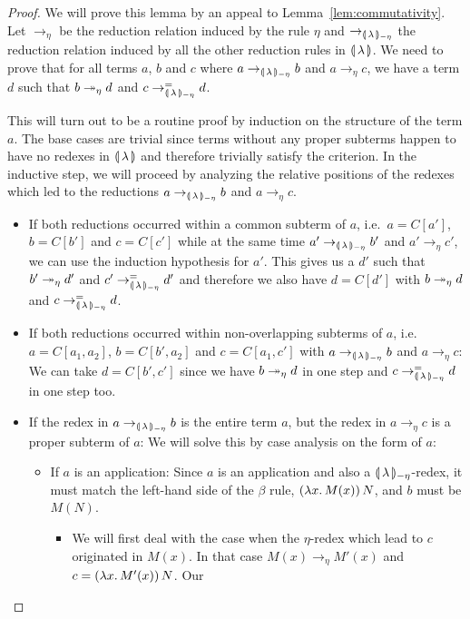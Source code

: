 \begin{proof}
  We will prove this lemma by an appeal to
  Lemma~\ref{lem:commutativity}. Let $\to_\eta$ be the reduction relation
  induced by the rule $\eta$ and $\to_{{\llparenthesis \, \lambda \, \rrparenthesis_{-\eta}}}$ the reduction
  relation induced by all the other reduction rules in
  $\llparenthesis \, \lambda \, \rrparenthesis$. We need to prove that for all terms $a$, $b$ and $c$
  where $a \to_{{\llparenthesis \, \lambda \, \rrparenthesis_{-\eta}}} b$ and $a \to_\eta c$, we have a term $d$ such that
  $b \twoheadrightarrow_\eta d$ and $c \to_{{\llparenthesis \, \lambda \, \rrparenthesis_{-\eta}}}^= d$.

  This will turn out to be a routine proof by induction on the structure of
  the term $a$. The base cases are trivial since terms without any proper
  subterms happen to have no redexes in $\llparenthesis \, \lambda \, \rrparenthesis$ and therefore
  trivially satisfy the criterion. In the inductive step, we will proceed
  by analyzing the relative positions of the redexes which led to the
  reductions $a \to_{{\llparenthesis \, \lambda \, \rrparenthesis_{-\eta}}} b$ and $a \to_\eta c$.
  \begin{itemize}
  \item If both reductions occurred within a common subterm of $a$, i.e.\
    $a = C[a']$, $b = C[b']$ and $c = C[c']$ while at the same time
    $a' \to_{{\llparenthesis \, \lambda \, \rrparenthesis_{-\eta}}} b'$ and $a' \to_\eta c'$, we can use the induction
    hypothesis for $a'$. This gives us a $d'$ such that $b' \twoheadrightarrow_\eta d'$
    and $c' \to_{{\llparenthesis \, \lambda \, \rrparenthesis_{-\eta}}}^= d'$ and therefore we also have $d = C[d']$ with
    $b \twoheadrightarrow_\eta d$ and $c \to_{{\llparenthesis \, \lambda \, \rrparenthesis_{-\eta}}}^= d$.
  \item If both reductions occurred within non-overlapping subterms of $a$,
    i.e.\ $a = C[a_1, a_2]$, $b = C[b', a_2]$ and $c = C[a_1, c']$ with
    $a \to_{{\llparenthesis \, \lambda \, \rrparenthesis_{-\eta}}} b$ and $a \to_\eta c$: We can take $d = C[b', c']$ since
    we have $b \twoheadrightarrow_\eta d$ in one step and $c \to_{{\llparenthesis \, \lambda \, \rrparenthesis_{-\eta}}}^= d$ in one step
    too.
  \item If the redex in $a \to_{{\llparenthesis \, \lambda \, \rrparenthesis_{-\eta}}} b$ is the entire term $a$, but the
    redex in $a \to_\eta c$ is a proper subterm of $a$: We will solve this
    by case analysis on the form of $a$:
    \begin{itemize}
    \item If $a$ is an application: Since $a$ is an application and also a
      ${\llparenthesis \, \lambda \, \rrparenthesis_{-\eta}}$-redex, it must match the left-hand side of the $\beta$
      rule, $(\lambda x.\, M(x))\,N$, and $b$ must be $M(N)$.
      \begin{itemize}
      \item We will first deal with the case when the $\eta$-redex which
        lead to $c$ originated in $M(x)$. In that case
        $M(x) \to_\eta M'(x)$ and $c = (\lambda x.\, M'(x))\,N$. Our

\end{itemize}
\end{itemize}
\end{itemize}
\end{proof}
